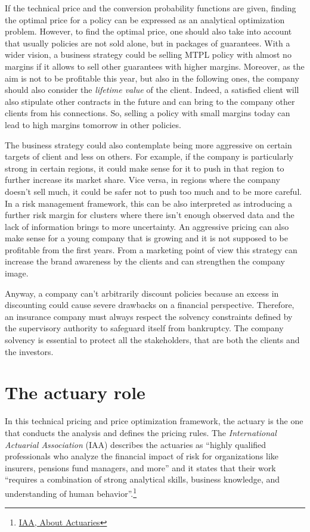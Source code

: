 \documentclass[a4paper, nobind]{templates/ociamthesis}
\theoremstyle{definition}
\theoremstyle{definition}
\theoremstyle{definition}
\theoremstyle{remark}
\begin{document}
If the technical price and the conversion probability functions are given, finding the optimal price for a policy can be expressed as an analytical optimization problem. However, to find the optimal price, one should also take into account that usually policies are not sold alone, but in packages of guarantees. With a wider vision, a business strategy could be selling MTPL policy with almost no margins if it allows to sell other guarantees with higher margins. Moreover, as the aim is not to be profitable this year, but also in the following ones, the company should also consider the \emph{lifetime value} of the client. Indeed, a satisfied client will also stipulate other contracts in the future and can bring to the company other clients from his connections. So, selling a policy with small margins today can lead to high margins tomorrow in other policies.

The business strategy could also contemplate being more aggressive on certain targets of client and less on others. For example, if the company is particularly strong in certain regions, it could make sense for it to push in that region to further increase its market share. Vice versa, in regions where the company doesn't sell much, it could be safer not to push too much and to be more careful. In a risk management framework, this can be also interpreted as introducing a further risk margin for clusters where there isn't enough observed data and the lack of information brings to more uncertainty. An aggressive pricing can also make sense for a young company that is growing and it is not supposed to be profitable from the first years. From a marketing point of view this strategy can increase the brand awareness by the clients and can strengthen the company image.

Anyway, a company can't arbitrarily discount policies because an excess in discounting could cause severe drawbacks on a financial perspective. Therefore, an insurance company must always respect the solvency constraints defined by the supervisory authority to safeguard itself from bankruptcy. The company solvency is essential to protect all the stakeholders, that are both the clients and the investors.

\hypertarget{the-actuary-role}{%
\section{The actuary role}\label{the-actuary-role}}

In this technical pricing and price optimization framework, the actuary is the one that conducts the analysis and defines the pricing rules. The \emph{International Actuarial Association} (IAA) describes the actuaries as ``highly qualified professionals who analyze the financial impact of risk for organizations like insurers, pensions fund managers, and more'' and it states that their work ``requires a combination of strong analytical skills, business knowledge, and understanding of human behavior''.\footnote{\href{https://www.actuaries.org/iaa/IAA/About_the_IAA/About_Actuaries/About\%20Actuaries.aspx}{IAA, About Actuaries}}
\end{document}
